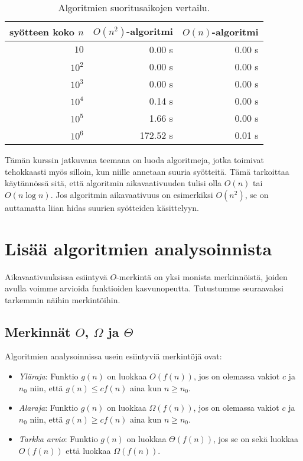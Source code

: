 \begin{table}
\center
\begin{tabular}{rrr}
syötteen koko $n$ & $O(n^2)$-algoritmi & $O(n)$-algoritmi \\
\hline
$10$ & 0.00 s & 0.00 s\\
$10^2$ & 0.00 s & 0.00 s\\
$10^3$ & 0.00 s & 0.00 s\\
$10^4$ & 0.14 s & 0.00 s \\
$10^5$ & 1.66 s & 0.00 s \\
$10^6$ & 172.52 s & 0.01 s \\
\end{tabular}
\caption{Algoritmien suoritusaikojen vertailu.}
\label{tab:algver}
\end{table}

Tämän kurssin jatkuvana teemana on luoda algoritmeja,
jotka toimivat tehokkaasti myös silloin, kun niille annetaan suuria syötteitä.
Tämä tarkoittaa käytännössä sitä, että algoritmin aikavaativuuden tulisi
olla $O(n)$ tai $O(n \log n)$.
Jos algoritmin aikavaativuus on esimerkiksi $O(n^2)$,
se on auttamatta liian hidas suurien syötteiden käsittelyyn.

\section{Lisää algoritmien analysoinnista}

Aikavaativuuksissa esiintyvä $O$-merkintä on yksi monista merkinnöistä,
joiden avulla voimme arvioida funktioiden kasvunopeutta.
Tutustumme seuraavaksi tarkemmin näihin merkintöihin.

\subsection{Merkinnät $O$, $\Omega$ ja $\Theta$}


Algoritmien analysoinnissa usein esiintyviä merkintöjä ovat:

\begin{itemize}
\item \emph{Yläraja}: Funktio $g(n)$ on luokkaa $O(f(n))$, jos on olemassa vakiot $c$ ja $n_0$
niin, että $g(n) \le c f(n)$ aina kun $n \ge n_0$.
\item \emph{Alaraja}: Funktio $g(n)$ on luokkaa $\Omega(f(n))$, jos on olemassa vakiot $c$ ja $n_0$
niin, että $g(n) \ge c f(n)$ aina kun $n \ge n_0$.
\item \emph{Tarkka arvio}: Funktio $g(n)$ on luokkaa $\Theta(f(n))$, jos se on sekä luokkaa $O(f(n))$
että luokkaa $\Omega(f(n))$.
\end{itemize}

